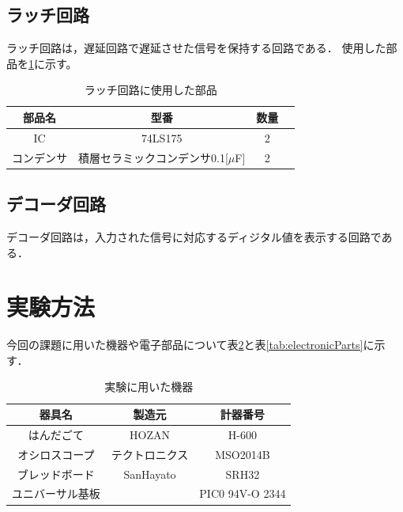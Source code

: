 \documentclass[a4paper,11pt,dvipdfmx]{jsarticle}
\begin{document}
\subsection{ラッチ回路}
ラッチ回路は，遅延回路で遅延させた信号を保持する回路である．
使用した部品を\ref{tab:latchparts}に示す。

\begin{table}[H]
  \centering
  \caption{ラッチ回路に使用した部品}
  \begin{tabular}{|c|c|c|c|}
    \hline
    部品名 & 型番 & 数量  \\
    \hline
    IC & 74LS175 & 2  \\
    コンデンサ & 積層セラミックコンデンサ0.1[$\mu$F] & 2  \\
    \hline
  \end{tabular}
  \label{tab:latchparts}
\end{table}

\subsection{デコーダ回路}
デコーダ回路は，入力された信号に対応するディジタル値を表示する回路である．

\section{実験方法}
今回の課題に用いた機器や電子部品について表\ref{tab:equipment}と表\ref{tab:electronicParts}に示す．

\begin{table}[H]
  \caption{実験に用いた機器}
  \centering
  \begin{tabular}{|c|c|c|}
    \hline
    器具名           & 製造元         & 計器番号        \\
    \hline
    はんだごて       & HOZAN          & H-600           \\
    \hline
    オシロスコープ   & テクトロニクス & MSO2014B        \\
    \hline
    ブレッドボード   & SanHayato      & SRH32           \\
    \hline
    ユニバーサル基板 &                & PIC0 94V-O 2344 \\
    \hline
  \end{tabular}
  \label{tab:equipment}
\end{table}
\end{document}
